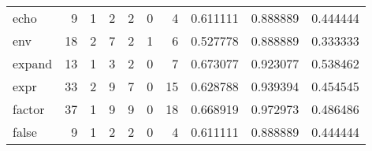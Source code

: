\begin{longtable}{lrrrrrrrrr}
echo      &                                       9 &                                                  1 &                                                  2 &                                                  2 &                                                  0 &                                                  4 &                                           0.611111 &                               0.888889 &                             0.444444 \\
env       &                                      18 &                                                  2 &                                                  7 &                                                  2 &                                                  1 &                                                  6 &                                           0.527778 &                               0.888889 &                             0.333333 \\
expand    &                                      13 &                                                  1 &                                                  3 &                                                  2 &                                                  0 &                                                  7 &                                           0.673077 &                               0.923077 &                             0.538462 \\
expr      &                                      33 &                                                  2 &                                                  9 &                                                  7 &                                                  0 &                                                 15 &                                           0.628788 &                               0.939394 &                             0.454545 \\
factor    &                                      37 &                                                  1 &                                                  9 &                                                  9 &                                                  0 &                                                 18 &                                           0.668919 &                               0.972973 &                             0.486486 \\
false     &                                       9 &                                                  1 &                                                  2 &                                                  2 &                                                  0 &                                                  4 &                                           0.611111 &                               0.888889 &                             0.444444 \\

\end{longtable}
